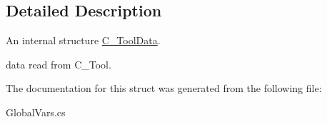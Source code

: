 \subsection{Detailed Description}
An internal structure \mbox{\hyperlink{struct_global_vars_1_1zone_specific_data_1_1_c___tool_data}{C\+\_\+\+Tool\+Data}}. 

data read from C\+\_\+\+Tool. 

The documentation for this struct was generated from the following file\+:\begin{DoxyCompactItemize}
\item 
Global\+Vars.\+cs\end{DoxyCompactItemize}
